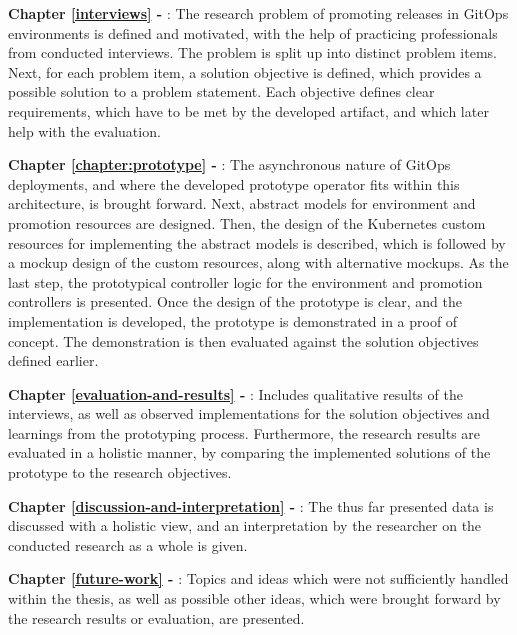 \textbf{Chapter \ref{interviews} - }:
The research problem of promoting releases in GitOps environments is defined and motivated,
with the help of practicing professionals from conducted interviews.
The problem is split up into distinct problem items.
Next, for each problem item,
a solution objective is defined, which provides a possible solution to a problem statement.
Each objective defines clear requirements, which have to be met by the developed artifact,
and which later help with the evaluation.

\textbf{Chapter \ref{chapter:prototype} - }:
The asynchronous nature of GitOps deployments,
and where the developed prototype operator fits within this architecture, is brought forward.
Next, abstract models for environment and promotion resources are designed.
Then, the design of the Kubernetes custom resources for implementing the abstract models is described,
which is followed by a mockup design of the custom resources, along with alternative mockups.
As the last step,
the prototypical controller logic for the environment and promotion controllers is presented.
Once the design of the prototype is clear, and the implementation is developed,
the prototype is demonstrated in a proof of concept.
The demonstration is then evaluated against the solution objectives defined earlier.

\textbf{Chapter \ref{evaluation-and-results} - }:
Includes qualitative results of the interviews, as well as observed implementations
for the solution objectives and learnings from the prototyping process.
Furthermore, the research results are evaluated in a holistic manner,
by comparing the implemented solutions of the prototype to the research objectives.

\textbf{Chapter \ref{discussion-and-interpretation} - }:
The thus far presented data is discussed with a holistic view,
and an interpretation by the researcher on the conducted research as a whole is given.

\textbf{Chapter \ref{future-work} - }:
Topics and ideas which were not sufficiently handled within the thesis,
as well as possible other ideas, which were brought forward by the research results or evaluation,
are presented.

